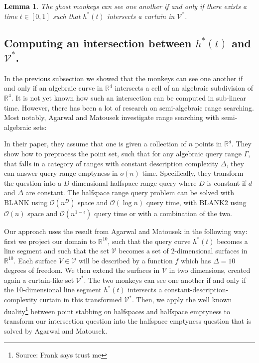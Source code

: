 \documentclass{article}
\newtheorem{lemma}{Lemma}
\begin{document}
\begin{lemma}
  The ghost monkeys can see one another if and only if there exists a time $t \in [0,1]$ such that $h^*(t)$ intersects a curtain in $\mathcal{V}^*$.
\end{lemma}





\subsection{Computing an intersection between $h^*(t)$ and $\mathcal{V}^*$.}

In the previous subsection we showed that the monkeys can see one another if and only if an algebraic curve in $\mathbb{R}^4$ intersects a cell of an algebraic subdivision of $\mathbb{R}^4$. It is not yet known how such an intersection can be computed in sub-linear time. However, there has been a lot of research on semi-algebraic range searching. Most notably, Agarwal and Matousek \cite{agarwal2013range} investigate range searching with semi-algebraic sets:

In their paper, they assume that one is given a collection of $n$ points in $\mathbb{R}^d$. They show how to preprocess the point set, such that for any algebraic query range $\Gamma$, that falls in a category of ranges with constant description complexity $\Delta$, they can answer query range emptyness in $o(n)$ time. Specifically, they transform the question into a $D$-dimensional halfspace range query where $D$ is constant if $d$ and $\Delta$ are constant. The halfspace range query problem can be solved with BLANK using $\mathcal{O}(n^D)$ space and $\mathcal{O}(\log n)$ query time, with BLANK2 using $\mathcal{O}(n)$ space and $\mathcal{O}(n^{1-\epsilon})$ query time or with a combination of the two. 

Our approach uses the result from Agarwal and  Matousek in the following way: first we project our domain to $\mathbb{R}^{10}$, such that the query curve $h^*(t)$ becomes a line segment and such that the set $\mathcal{V}$ becomes a set of $2$-dimensional surfaces in $\mathbb{R}^{10}$. Each surface $V \in \mathcal{V}$ will be described by a function $f$ which has $\Delta = 10$ degrees of freedom.  We then extend the surfaces in $\mathcal{V}$ in two dimensions, created again a curtain-like set $\mathcal{V}^*$. The two monkeys can see one another if and only if the 10-dimensional line segment $h^*(t)$ intersects a constant-description-complexity curtain in this transformed $\mathcal{V}^*$. Then, we apply the well known duality\footnote{Source: Frank says trust me} between point stabbing on halfspaces and halfspace emptyness to transform our intersection question into the halfspace emptyness question that is solved by Agarwal and Matousek.
\end{document}
